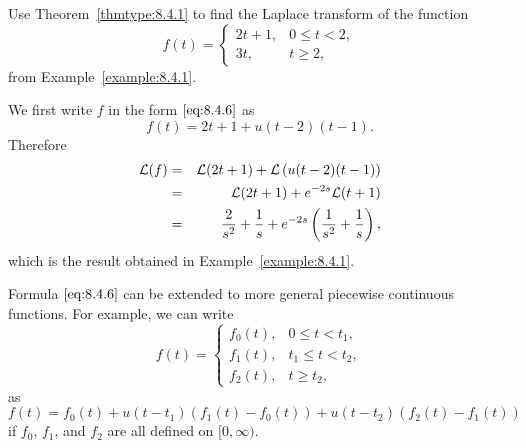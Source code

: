 \documentclass{ximera}
\begin{document}
\begin{example}\label{example:8.4.3}
Use Theorem~\ref{thmtype:8.4.1} to find the Laplace transform of the
function
$$
f(t)=\left\{\begin{array}{cl} 2t+1,&0\leq t<2,\\ 3t,&t\geq 2,
\end{array}\right.
$$
from Example~\ref{example:8.4.1}.


\begin{explanation}
We first write $f$ in the form $\eqref{eq:8.4.6}$ as
$$
f(t)=2t+1+u(t-2)(t-1).
$$
Therefore
\begin{eqnarray*}
{\cal L}(f)&=&{\cal L}(2t+1) +{\cal L}\left(u(t-2)(t-1)\right)\\
&=&{\cal L}(2t+1) +e^{-2s}{\cal L}(t+1)\\
&=&\frac{2}{s^2}+\frac{1}{s}+e^{-2s}\left(\frac{1}{s^2}+\frac{1}{s}\right),
\end{eqnarray*}
which is the result obtained in Example~\ref{example:8.4.1}.

Formula $\eqref{eq:8.4.6}$ can be extended to more general piecewise continuous
functions. For example, we can write
$$
f(t)=\left\{\begin{array}{rl}
f_0(t),&0\leq t<t_1,\\
f_1(t),&t_1\leq t<t_2,\\
f_2(t),&t\geq t_2,
\end{array}\right.
$$
as
$$
f(t)=f_0(t)+u(t-t_1)\left(f_1(t)-f_0(t)\right)+
u(t-t_2)\left(f_2(t)-f_1(t)\right)
$$
if $f_0$, $f_1$, and $f_2$ are all defined on $[0,\infty)$.
\end{explanation}
\end{example}
\end{document}
